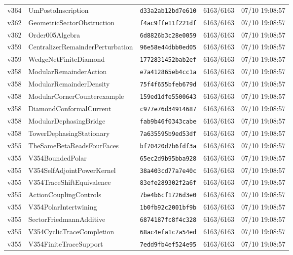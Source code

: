 \documentclass[11pt]{article}
\theoremstyle{definition}\newtheorem{deriv}{Derivation}
\begin{document}
{\begin{longtable}{@{}lllll@{}}
v364 & UmPostoInscription & \texttt{d33a2ab12bd7e610} & 6163/6163 & 07/10 19:08:57 \\
v362 & GeometricSectorObstruction & \texttt{f4ac9ffe11f221df} & 6163/6163 & 07/10 19:08:57 \\
v362 & Order005Algebra & \texttt{6d8826b3c28e0059} & 6163/6163 & 07/10 19:08:57 \\
v359 & CentralizerRemainderPerturbation & \texttt{96e58e44dbb0ed05} & 6163/6163 & 07/10 19:08:57 \\
v359 & WedgeNetFiniteDiamond & \texttt{1772831452bab2ef} & 6163/6163 & 07/10 19:08:57 \\
v358 & ModularRemainderAction & \texttt{e7a412865eb4cc1a} & 6163/6163 & 07/10 19:08:57 \\
v358 & ModularRemainderDensity & \texttt{75f4f655bfeb679d} & 6163/6163 & 07/10 19:08:57 \\
v358 & ModularCornerCounterexample & \texttt{159ed1dfe5500643} & 6163/6163 & 07/10 19:08:57 \\
v358 & DiamondConformalCurrent & \texttt{c977e76d34914687} & 6163/6163 & 07/10 19:08:57 \\
v358 & ModularDephasingBridge & \texttt{fab9b46f0343cabe} & 6163/6163 & 07/10 19:08:57 \\
v358 & TowerDephasingStationary & \texttt{7a635595b9ed53df} & 6163/6163 & 07/10 19:08:57 \\
v355 & TheSameBetaReadsFourFaces & \texttt{bf70420d7b6fdf3a} & 6163/6163 & 07/10 19:08:57 \\
v355 & V354BoundedPolar & \texttt{65ec2d9b95bba928} & 6163/6163 & 07/10 19:08:57 \\
v355 & V354SelfAdjointPowerKernel & \texttt{38a403cd77a7e40c} & 6163/6163 & 07/10 19:08:57 \\
v355 & V354TraceShiftEquivalence & \texttt{83efe289302f2a6f} & 6163/6163 & 07/10 19:08:57 \\
v355 & ActionCouplingControls & \texttt{7be4b6cf1726d3e0} & 6163/6163 & 07/10 19:08:57 \\
v355 & V354PolarIntertwining & \texttt{1b0fb92c2001bf9b} & 6163/6163 & 07/10 19:08:57 \\
v355 & SectorFriedmannAdditive & \texttt{6874187fc8f4c328} & 6163/6163 & 07/10 19:08:57 \\
v355 & V354CyclicTraceCompletion & \texttt{68ac4efa1c7a54ed} & 6163/6163 & 07/10 19:08:57 \\
v355 & V354FiniteTraceSupport & \texttt{7edd9fb4ef524e95} & 6163/6163 & 07/10 19:08:57 \\

\end{longtable}}
\end{document}
